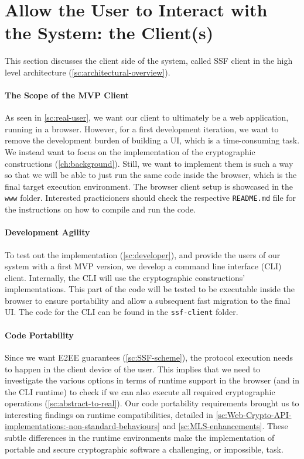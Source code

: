\section{Allow the User to Interact with the System: the Client(s)}\label{sc:client-overview}

This section discusses the client side of the system,
called SSF client in the high level architecture (\cref{sc:architectural-overview}).

\paragraph{The Scope of the MVP Client}
As seen in \cref{sc:real-user}, 
we want our client to ultimately be a web application,
running in a browser.
However, for a first development iteration, we want to
remove the development burden of building a UI, which is
a time-consuming task. We instead want to focus on the
implementation of the cryptographic constructions (\cref{ch:background}). 
Still, we want to implement them is such a way so that we
will be able to just run the same code inside the browser,
which is the final target execution environment.
The browser client setup is showcased
in the \texttt{www} folder. Interested practicioners
should check the respective \texttt{README.md} file
for the instructions on how to compile and run the code.

\paragraph{Development Agility} 
To test out the implementation (\cref{sc:developer}), 
and provide the users of our system
with a first MVP version, we develop a
command line interface (CLI) client.
Internally, the CLI will use the cryptographic constructions'
implementations. This part of the code will be tested to be executable
inside the browser to ensure portability and allow a subsequent fast
migration to the final UI. The code for the CLI
can be found in the \texttt{ssf-client} folder.

\paragraph{Code Portability}
Since we want E2EE guarantees (\cref{sc:SSF-scheme}), the protocol execution needs to happen
in the client device of the user.
This implies that we need to investigate the various options
in terms of runtime support in the browser (and in the CLI runtime) 
to check if we can also execute all required cryptographic 
operations (\cref{sc:abstract-to-real}).
Our code portability requirements brought us to interesting
findings on runtime compatibilities,
detailed in \cref{sc:Web-Crypto-API-implementations:-non-standard-behaviours}
and \cref{sc:MLS-enhancements}.
These subtle differences in the runtime environments
make the implementation of portable and secure 
cryptographic software a challenging, or impossible, 
task.

